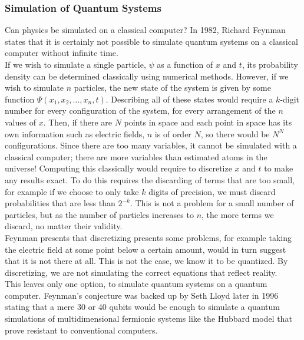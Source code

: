 \documentclass[reqno]{amsart}
\numberwithin{equation}{section}
\numberwithin{figure}{section}
\begin{document}
\subsubsection{Simulation of Quantum Systems}
\begin{justify}
Can physics be simulated on a classical computer? In 1982, Richard Feynman states that it is certainly not possible to simulate quantum systems on a classical computer without infinite time. \cite{Feynman1982} \\

If we wish to simulate a single particle, $\psi$ as a function of $x$ and $t$, its probability density can be determined classically using numerical methods. \cite{Schroedinger1926} However, if we wish to simulate $n$ particles, the new state of the system is given by some function $\Psi(x_{1}, x_{2}, \ldots, x_{n}, t)$. Describing all of these states would require a $k$-digit number for every configuration of the system, for every arrangement of the $n$ values of $x$. Then, if there are $N$ points in space and each point in space has its own information such as electric fields, $n$ is of order $N$, so there would be $N^N$ configurations. Since there are too many variables, it cannot be simulated with a classical computer; there are more variables than estimated atoms in the universe! Computing this classically would require to discretize $x$ and $t$ to make any results exact. To do this requires the discarding of terms that are too small, for example if we choose to only take $k$ digits of precision, we must discard probabilities that are less than $2^{-k}$. This is not a problem for a small number of particles, but as the number of particles increases to $n$, the more terms we discard, no matter their validity. \\

Feynman presents that discretizing presents some problems, for example taking the electric field at some point below a certain amount, would in turn suggest that it is not there at all. This is not the case, we know it to be quantized. By discretizing, we are not simulating the correct equations that reflect reality. \\

This leaves only one option, to simulate quantum systems on a quantum computer. Feynman's conjecture was backed up by Seth Lloyd later in 1996 \cite{Lloyd1996} stating that a mere 30 or 40 qubits would be enough to simulate a quantum simulations of multidimensional fermionic systems like the Hubbard model \cite{Hubbard1963} that prove resistant to conventional computers. \\
\end{justify}
\end{document}
